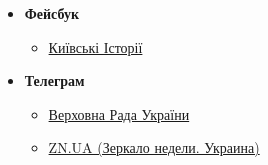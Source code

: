 \begin{itemize}
\item \textbf{Фейсбук}

\begin{itemize}
\item \href{https://www.facebook.com/groups/story.kiev.ua}{Київські Історії}
\end{itemize}

\item \textbf{Телеграм}

\begin{itemize}
\item \href{https://t.me/verkhovnaradaofukraine}{Верховна Рада України}
\item \href{https://t.me/znua_live}{ZN.UA (Зеркало недели. Украина)}
\end{itemize}


\end{itemize}
